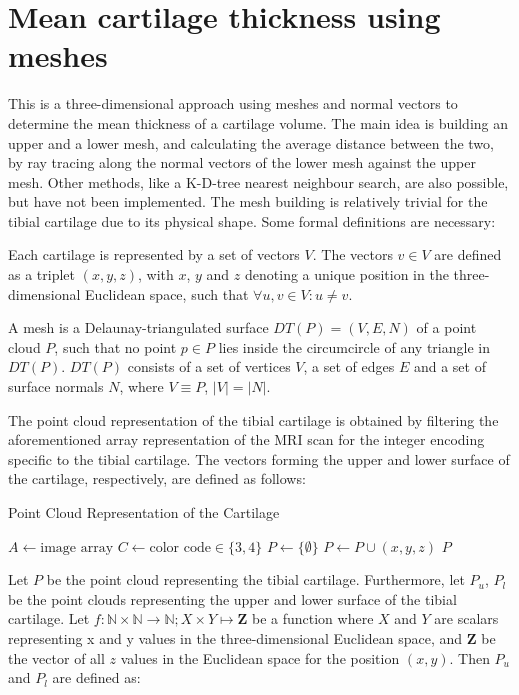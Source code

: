 \section{Mean cartilage thickness using meshes}
\label{sec:Meshes}
This is a three-dimensional approach using meshes and normal vectors to determine the mean thickness of a cartilage volume. The main idea is building an upper and a lower mesh, and calculating the average distance between the two, by ray tracing along the normal vectors of the lower mesh against the upper mesh. Other methods, like a K-D-tree nearest neighbour search, are also possible, but have not been implemented. The mesh building is relatively trivial for the tibial cartilage due to its physical shape. Some formal definitions are necessary:
\begin{theorem}
	Each cartilage is represented by a set of vectors $V$. The vectors $v \in V$ are defined as a triplet $(x, y, z)$, with $x$, $y$ and $z$ denoting a unique position in the three-dimensional Euclidean space, such that $\forall u, v \in V: u \neq v$.
\end{theorem}
\begin{theorem}[Mesh]
	A mesh is a Delaunay-triangulated surface $DT(P) = (V, E, N)$ of a point cloud $P$, such that no point $p \in P$ lies inside the circumcircle of any triangle in $DT(P)$. \cite{enwiki:delaunay} $DT(P)$ consists of a set of vertices $V$, a set of edges $E$ and a set of surface normals $N$, where $V \equiv P$, $\lvert V \rvert = \lvert N \rvert$.
\end{theorem}
The point cloud representation of the tibial cartilage is obtained by filtering the aforementioned array representation of the MRI scan for the integer encoding specific to the tibial cartilage. The vectors forming the upper and lower surface of the cartilage, respectively, are defined as follows:
\begin{algorithm}
	\caption{Point Cloud Representation of the Cartilage}
	\label{algo:pointcloud}
	\begin{algorithmic}[1]
		\State $A \gets \text{image array}$
		\State $C \gets \text{color code} \in \{3,4\}$
		\State $P \gets \{\emptyset\}$
				\State $P \gets P \cup (x,y,z)$
				\State
			\EndIf
		\EndFor
		\Return $P$
		\EndProcedure
	\end{algorithmic}
\end{algorithm}
Let $P$ be the point cloud representing the tibial cartilage. Furthermore, let $P_{u}$, $P_{l}$ be the point clouds representing the upper and lower surface of the tibial cartilage. Let $f: \mathbb{N} \times \mathbb{N} \rightarrow \mathbb{N}; X \times Y \mapsto \mathbf{Z}$ be a function where $X$ and $Y$ are scalars representing x and y values in the three-dimensional Euclidean space, and $\mathbf{Z}$ be the vector of all $z$ values in the Euclidean space for the position $(x,y)$. Then $P_{u}$ and $P_{l}$ are defined as:
